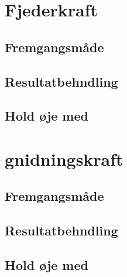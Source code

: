 \section{Fjederkraft}
\subsection{Fremgangsmåde}

\subsection{Resultatbehndling}

\subsection{Hold øje med}

\section{gnidningskraft}
\subsection{Fremgangsmåde}

\subsection{Resultatbehndling}

\subsection{Hold øje med}
